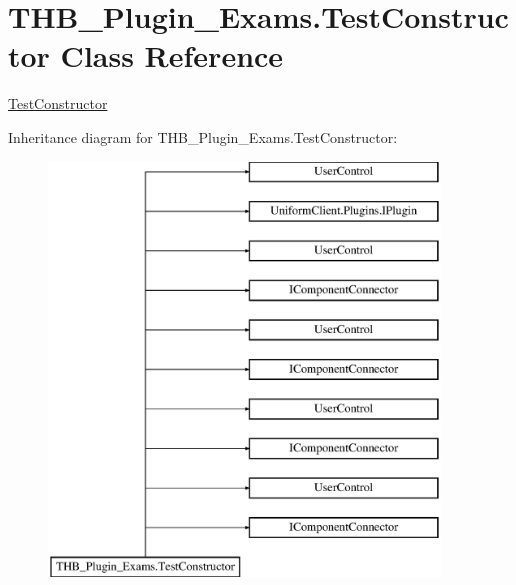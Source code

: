 \hypertarget{class_t_h_b___plugin___exams_1_1_test_constructor}{}\section{T\+H\+B\+\_\+\+Plugin\+\_\+\+Exams.\+Test\+Constructor Class Reference}
\label{class_t_h_b___plugin___exams_1_1_test_constructor}


\mbox{\hyperlink{class_t_h_b___plugin___exams_1_1_test_constructor}{Test\+Constructor}}  


Inheritance diagram for T\+H\+B\+\_\+\+Plugin\+\_\+\+Exams.\+Test\+Constructor\+:\begin{figure}[H]
\begin{center}
\leavevmode
\includegraphics[height=11.000000cm]{d4/d8d/class_t_h_b___plugin___exams_1_1_test_constructor}
\end{center}
\end{figure}
